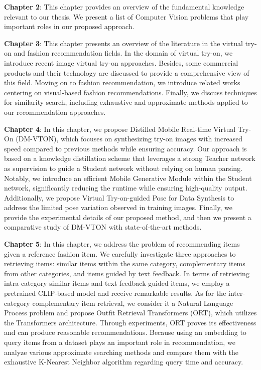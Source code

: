\textbf{Chapter 2}: This chapter provides an overview of the fundamental knowledge relevant to our thesis. We present a list of Computer Vision problems that play important roles in our proposed approach.

\textbf{Chapter 3}: This chapter presents an overview of the literature in the virtual try-on and fashion recommendation fields. In the domain of virtual try-on, we introduce recent image virtual try-on approaches. Besides, some commercial products and their technology are discussed to provide a comprehensive view of this field. Moving on to fashion recommendation, we introduce related works centering on visual-based fashion recommendations. Finally, we discuss techniques for similarity search, including exhaustive and approximate methods applied to our recommendation approaches.

\textbf{Chapter 4}: In this chapter, we propose Distilled Mobile Real-time Virtual Try-On (DM-VTON), which focuses on synthesizing try-on images with increased speed compared to previous methods while ensuring accuracy. Our approach is based on a knowledge distillation scheme that leverages a strong Teacher network as supervision to guide a Student network without relying on human parsing. Notably, we introduce an efficient Mobile Generative Module within the Student network, significantly reducing the runtime while ensuring high-quality output. Additionally, we propose Virtual Try-on-guided Pose for Data Synthesis to address the limited pose variation observed in training images. Finally, we provide the experimental details of our proposed method, and then we present a comparative study of DM-VTON with state-of-the-art methods.

\textbf{Chapter 5}: In this chapter, we address the problem of recommending items given a reference fashion item. We carefully investigate three approaches to retrieving items: similar items within the same category, complementary items from other categories, and items guided by text feedback. 
In terms of retrieving intra-category similar items and text feedback-guided items, we employ a pretrained CLIP-based model and receive remarkable results. As for the inter-category complementary item retrieval, we consider it a Natural Language Process problem and propose Outfit Retrieval Transformers (ORT), which utilizes the Transformers architecture. Through experiments, ORT proves its effectiveness and can produce reasonable recommendations. Because using an embedding to query items from a dataset plays an important role in recommendation, we analyze various approximate searching methods and compare them with the exhaustive K-Nearest Neighbor algorithm regarding query time and accuracy.

